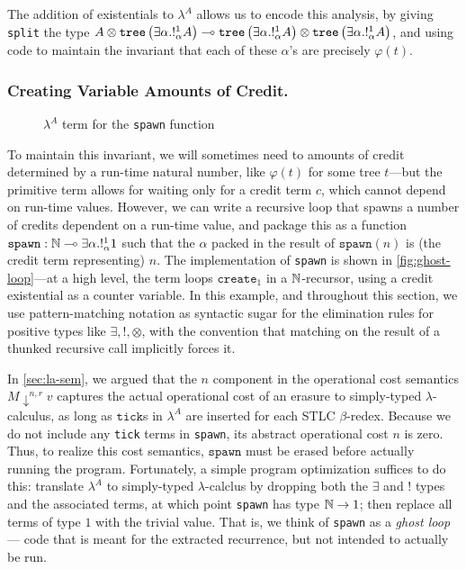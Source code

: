 The addition of existentials to $\lambda^A$ allows us to encode this analysis, by giving \texttt{split} the type $A \otimes \texttt{tree}\left(\exists   \alpha.!^1_\alpha A\right) \multimap \texttt{tree}\left(\exists \alpha.!^1_\alpha A\right) \otimes \texttt{tree}\left(\exists \alpha.!^1_\alpha A\right)$, and using code to maintain the invariant that each of these $\alpha$'s are precisely $\varphi(t)$.


\subsubsection{Creating Variable Amounts of Credit.}

\begin{figure}
  \vspace{-0.1in}
  
  \vspace{-0.2in}
  \caption{$\lambda^A$ term for the \texttt{spawn} function}
  \label{fig:ghost-loop}
\end{figure}

To maintain this invariant, we will sometimes need to \waitname\/ amounts of credit determined by a run-time natural number, like $\varphi(t)$ for some tree $t$---but the primitive  term allows for waiting only for a credit term $c$, which cannot depend on run-time values.
However, we can write a recursive loop that spawns a number of credits
dependent on a run-time value, and package this as a function
$\texttt{spawn} : \mathbb{N} \multimap \exists \alpha . !^1_\alpha 1$
such that the $\alpha$ packed in the result of $\texttt{spawn}(n)$ is (the credit term representing) $n$.
The implementation of \texttt{spawn}\/ is shown in \autoref{fig:ghost-loop}---at a high level,
the term loops $\texttt{create}_1$ in a $\mathbb{N}$-recursor, using a credit existential as a counter variable.
In this example, and throughout this section, we use pattern-matching notation as syntactic sugar for the elimination rules for positive types like $\exists,!,\otimes$, with the convention that matching on the result of a thunked recursive call implicitly forces it.

In \autoref{sec:la-sem}, we argued that
the $n$ component in the operational cost semantics $M \downarrow^{n,r} v$ captures the actual operational cost of an erasure to simply-typed $\lambda$-calculus, as long as $\texttt{tick}$s in $\lambda^A$ are inserted for each STLC $\beta$-redex.  Because we do not include any \texttt{tick} terms in \texttt{spawn}, its abstract operational cost $n$ is zero.  Thus, to realize this cost semantics, $\texttt{spawn}$ must be erased before actually running the program.  Fortunately, a simple program optimization suffices to do this: translate $\lambda^A$ to simply-typed $\lambda$-calclus by dropping both the $\exists$ and $!$ types and the associated terms, at which point \texttt{spawn} has type $\mathbb{N} \to 1$; then replace all terms of type $1$ with the trivial value.
That is, we think of \texttt{spawn} as a \emph{ghost loop} --- code that is meant for the extracted recurrence, but not intended to actually be run.  

